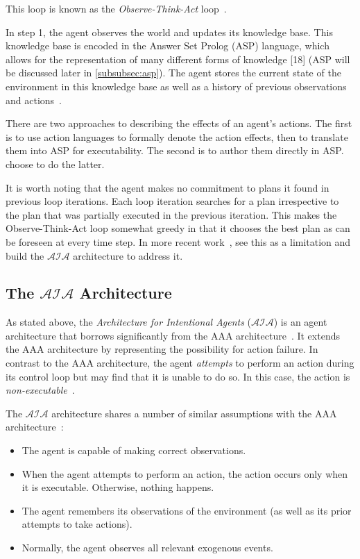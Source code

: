 This loop is known as the \textit{Observe-Think-Act} loop~\citep{balduccini_aaa_2008}.

In step 1, the agent observes the world and updates its knowledge base.
This knowledge base is encoded in the Answer Set Prolog (ASP) language, which allows for the representation of many different forms of knowledge [18] (ASP will be discussed later in \cref{subsubsec:asp}).
The agent stores the current state of the environment in this knowledge base as well as a history of previous observations and actions~\citep{balduccini_aaa_2008}.

There are two approaches to describing the effects of an agent's actions.
The first is to use action languages to formally denote the action effects, then to translate them into ASP for executability.
The second is to author them directly in ASP.
\citet{balduccini_aaa_2008} choose to do the latter.

It is worth noting that the agent makes no commitment to plans it found in previous loop iterations.
Each loop iteration searches for a plan irrespective to the plan that was partially executed in the previous iteration.
This makes the Observe-Think-Act loop somewhat greedy in that it chooses the best plan as can be foreseen at every time step.
In more recent work~\citep{blount_towards_2014}, \citeauthor{blount_towards_2014} see this as a limitation and build the $\mathcal{AIA}$ architecture to address it.

\subsection{The $\mathcal{AIA}$ Architecture}
\label{subsec:aia_architecture}

As stated above, the \textit{Architecture for Intentional Agents} ($\mathcal{AIA}$) is an agent architecture that borrows significantly from the AAA architecture~\citep{blount_towards_2014}.
It extends the AAA architecture by representing the possibility for action failure.
In contrast to the AAA architecture, the agent \textit{attempts} to perform an action during its control loop but may find that it is unable to do so.
In this case, the action is \textit{non-executable}~\citep{blount_towards_2014}.

The $\mathcal{AIA}$ architecture shares a number of similar assumptions with the AAA architecture~\citep{blount_towards_2014}:

\begin{itemize}
    \item The agent is capable of making correct observations.
    \item When the agent attempts to perform an action, the action occurs only when it is executable.
        Otherwise, nothing happens.
    \item The agent remembers its observations of the environment (as well as its prior attempts to take actions).
    \item Normally, the agent observes all relevant exogenous events.
\end{itemize}

